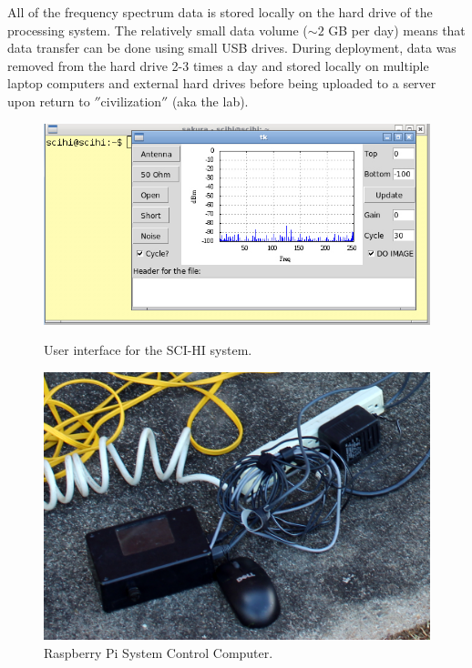 All of the frequency spectrum data is stored locally on the hard drive of the processing system. The relatively small data volume ($\sim 2$ GB per day) means that data transfer can be done using small USB drives. During deployment, data was removed from the hard drive 2-3 times a day and stored locally on multiple laptop computers and external hard drives before being uploaded to a server upon return to $''$civilization$''$ (aka the lab). 

\begin{figure}[htb]
\centering
\begin{minipage}[b]{0.48\textwidth}
\centering
\includegraphics[width=0.95\linewidth]{SCIHI_system/figures/SCIHI_UI_Screen.jpg}
\caption{User interface for the SCI-HI system. }
\label{Fig:GUI}
\end{minipage}%
\begin{minipage}[b]{0.02\textwidth}
\hspace{1cm}
\end{minipage}%
\begin{minipage}[b]{0.48\textwidth}
\centering
\includegraphics[width=0.95\linewidth]{SCIHI_system/figures/SCIHI_raspberry_pi.jpg}
\caption{Raspberry Pi System Control Computer.}
\label{Fig:raspberry_pi}

\end{minipage}
\end{figure}


